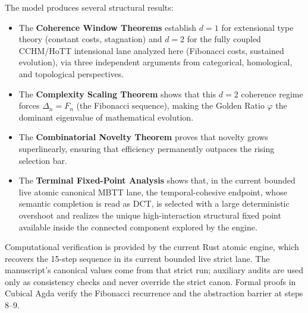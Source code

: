 \documentclass[11pt,a4paper]{article}
\theoremstyle{plain}
\theoremstyle{definition}
\theoremstyle{remark}
\begin{document}
The model produces several structural results:
\begin{itemize}[nosep]
    \item The \textbf{Coherence Window Theorems} establish $d = 1$ for extensional type theory (constant costs, stagnation) and $d = 2$ for the fully coupled CCHM/HoTT intensional lane analyzed here (Fibonacci costs, sustained evolution), via three independent arguments from categorical, homological, and topological perspectives.
    \item The \textbf{Complexity Scaling Theorem} shows that this $d = 2$ coherence regime forces $\Delta_n = F_n$ (the Fibonacci sequence), making the Golden Ratio $\varphi$ the dominant eigenvalue of mathematical evolution.
    \item The \textbf{Combinatorial Novelty Theorem} proves that novelty grows superlinearly, ensuring that efficiency permanently outpaces the rising selection bar.
    \item The \textbf{Terminal Fixed-Point Analysis} shows that, in the current bounded live atomic canonical MBTT lane, the temporal-cohesive endpoint, whose semantic completion is read as DCT, is selected with a large deterministic overshoot and realizes the unique high-interaction structural fixed point available inside the connected component explored by the engine.
\end{itemize}
Computational verification is provided by the current Rust atomic engine, which recovers the 15-step sequence in its current bounded live strict lane.
The manuscript's canonical values come from that strict run; auxiliary audits are used only as consistency checks and never override the strict canon.
Formal proofs in Cubical Agda verify the Fibonacci recurrence and the abstraction barrier at steps 8--9.
\end{document}
